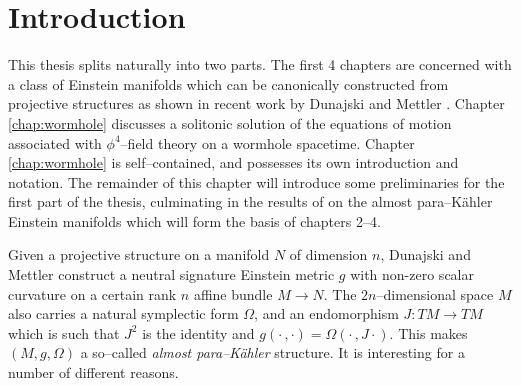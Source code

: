 

\chapter{Introduction}\label{chap:intro}


This thesis splits naturally into two parts. The first 4 chapters are concerned with a class of Einstein manifolds which can be canonically constructed from projective structures as shown in recent work by Dunajski and Mettler \cite{DM}. Chapter \ref{chap:wormhole} discusses a solitonic solution of the equations of motion associated with $\phi^4$--field theory on a wormhole spacetime. Chapter \ref{chap:wormhole} is self--contained, and possesses its own introduction and notation. The remainder of this chapter will introduce some preliminaries for the first part of the thesis, culminating in the results of \cite{DM} on the almost para--K\"ahler Einstein manifolds which will form the basis of chapters 2--4.



Given a projective structure on a manifold $N$ of dimension $n$,
Dunajski and Mettler \cite{DM} construct a neutral signature Einstein metric $g$ with non-zero
scalar curvature on a certain rank $n$ affine bundle $M\rightarrow N$.
The $2n$--dimensional space $M$ also carries a natural symplectic form $\Omega$, and an endomorphism $J:TM\rightarrow TM$ which is such that $J^2$ is the identity and $g(\cdot\,,\cdot)=\Omega(\cdot\,,J\cdot)$. This makes $(M,g,\Omega)$ a so--called \textit{almost para--K\"ahler} structure. It is interesting for a number of different reasons.

